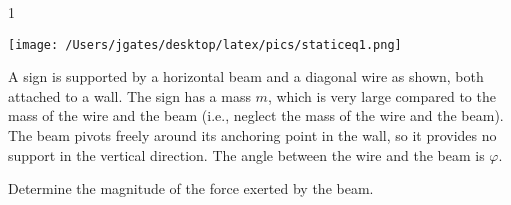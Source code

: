 
\AddToShipoutPicture*{\BackgroundPic}

\addtocounter {ProbNum} {1}

\begin{floatingfigure}[r]{.35\textwidth}
\texttt{[image: /Users/jgates/desktop/latex/pics/staticeq1.png]}
\end{floatingfigure}
 
{\bf \Large{}} A sign is supported by a horizontal beam and a diagonal wire as shown, both attached to a wall. The sign has a mass $m$, which is very large compared to the mass of the wire and the beam (i.e., neglect the mass of the wire and the beam). The beam pivots freely around its anchoring point in the wall, so it provides no support in the vertical direction. The angle between the wire and the beam is $\varphi$. 

\bigskip
Determine the magnitude of the force exerted by the beam.



\vfill
\newpage